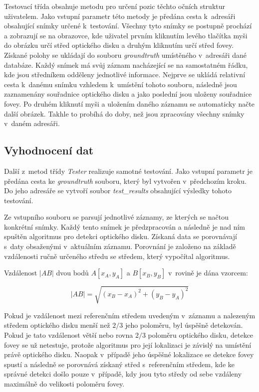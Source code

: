 Testovací třída obsahuje metodu pro určení pozic těchto očních struktur uživatelem. Jako vstupní parametr této metody je předána cesta k~adresáři obsahující snímky určené k~testování. Všechny tyto snímky se postupně prochází a zobrazují se na obrazovce, kde uživatel prvním kliknutím levého tlačítka myši do obrázku určí střed optického disku a druhým kliknutím určí střed fovey. Získané polohy se ukládají do souboru \emph{groundtruth} umístěného v~adresáři dané databáze. Každý snímek má svůj záznam nacházející se na samostatném řádku, kde jsou středníkem odděleny jednotlivé informace. Nejprve se ukládá relativní cesta k~danému snímku vzhledem k~umístění tohoto souboru, následně jsou zaznamenány souřadnice optického disku a jako poslední jsou uloženy souřadnice fovey. Po druhém kliknutí myši a uložením daného záznamu se automaticky načte další obrázek. Takhle to probíhá do doby, než jsou zpracovány všechny snímky v~daném adresáři.

\subsection*{Vyhodnocení dat}
Další z~metod třídy \emph{Tester} realizuje samotné testování. Jako vstupní parametr je předána cesta ke \emph{groundtruth} souboru, který byl vytvořen v~předchozím kroku. Do jeho adresáře se vytvoří soubor \emph{test\_results} obsahující výsledky tohoto testování. 

Ze vstupního souboru se parsují jednotlivé záznamy, ze kterých se načtou konkrétní snímky. Každý tento snímek je předzpracován a následně je nad ním spuštěn algoritmus pro detekci optického disku. Získaná data se porovnávají s~daty obsaženými v~aktuálním záznamu. Porovnání je založeno na základě vzdálenosti ručně určeného středu se středem, který vypočítal algoritmus. 

Vzdálenost $|AB|$ dvou bodů $A[x_A, y_A]$ a $B[x_B, y_B]$ v~rovině je dána vzorcem:

\begin{equation}
  |AB| = \sqrt{(x_B - x_A)^2 + (y_B - y_A)^2}
\end{equation}

Pokud je vzdálenost mezi referenčním středem uvedeným v~záznamu a nalezeným středem optického disku menší než $2/3$ jeho poloměru, byl úspěšně detekován. Pokud je tato vzdálenost větší nebo rovna $2/3$ poloměru optického disku, detekce fovey se už netestuje, protože algoritmus pro její lokalizaci je závislý na umístění právě optického disku. Naopak v~případě jeho úspěšné lokalizace se detekce fovey spustí a následně se porovnává získaný střed s~referenčním středem, kde ke správné detekci došlo pouze v~případě, kdy jsou tyto středy od sebe vzdáleny maximálně do velikosti poloměru fovey.

